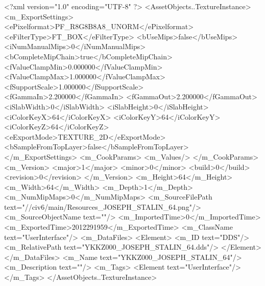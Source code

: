 <?xml version="1.0" encoding="UTF-8" ?>
<AssetObjects..TextureInstance>
	<m_ExportSettings>
		<ePixelformat>PF_R8G8B8A8_UNORM</ePixelformat>
		<eFilterType>FT_BOX</eFilterType>
		<bUseMips>false</bUseMips>
		<iNumManualMips>0</iNumManualMips>
		<bCompleteMipChain>true</bCompleteMipChain>
		<fValueClampMin>0.000000</fValueClampMin>
		<fValueClampMax>1.000000</fValueClampMax>
		<fSupportScale>1.000000</fSupportScale>
		<fGammaIn>2.200000</fGammaIn>
		<fGammaOut>2.200000</fGammaOut>
		<iSlabWidth>0</iSlabWidth>
		<iSlabHeight>0</iSlabHeight>
		<iColorKeyX>64</iColorKeyX>
		<iColorKeyY>64</iColorKeyY>
		<iColorKeyZ>64</iColorKeyZ>
		<eExportMode>TEXTURE_2D</eExportMode>
		<bSampleFromTopLayer>false</bSampleFromTopLayer>
	</m_ExportSettings>
	<m_CookParams>
		<m_Values/>
	</m_CookParams>
	<m_Version>
		<major>1</major>
		<minor>0</minor>
		<build>0</build>
		<revision>0</revision>
	</m_Version>
	<m_Height>64</m_Height>
	<m_Width>64</m_Width>
	<m_Depth>1</m_Depth>
	<m_NumMipMaps>0</m_NumMipMaps>
	<m_SourceFilePath text="//civ6/main/Resources_JOSEPH_STALIN_64.png"/>
	<m_SourceObjectName text=""/>
	<m_ImportedTime>0</m_ImportedTime>
	<m_ExportedTime>2012291959</m_ExportedTime>
	<m_ClassName text="UserInterface"/>
	<m_DataFiles>
		<Element>
			<m_ID text="DDS"/>
			<m_RelativePath text="YKKZ000_JOSEPH_STALIN_64.dds"/>
		</Element>
	</m_DataFiles>
	<m_Name text="YKKZ000_JOSEPH_STALIN_64"/>
	<m_Description text=""/>
	<m_Tags>
		<Element text="UserInterface"/>
	</m_Tags>
</AssetObjects..TextureInstance>

